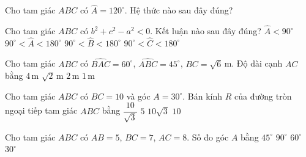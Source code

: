 \begin{ex}%
	Cho tam giác $ABC$  có $\widehat{A}=120^{\circ}$. Hệ thức nào sau đây đúng?
\end{ex}

\begin{ex}%
	Cho tam  giác $ABC$ có $b^2+c^2-a^2< 0$. Kết luận nào sau đây đúng?
	 \choice
		{$\widehat{A} <  90^\circ$}
		{\True $90^\circ  < \widehat{A} < 180^\circ$}
		{$90^\circ < \widehat{B} < 180^\circ$} 
		{$90^\circ < \widehat{C} < 180^\circ$} 
\end{ex}

\begin{ex}%
	Cho tam giác $ABC$ có $\widehat{BAC}=60^\circ$, $\widehat{ABC}=45^\circ$, $BC=\sqrt{6} $\,m. Độ dài cạnh  $AC$ bằng
	 \choice
		{$4$\,m} 
		 {$\sqrt{2}$\,m}
		 {\True $2$\,m}
		{$1$\,m} 
\end{ex}

\begin{ex}%
	 Cho tam giác $ABC$ có $BC=10$ và góc $A=30^\circ$. Bán kính $R$ của đường tròn ngoại tiếp tam giác $ABC$ bằng
	 \choice
		{$\dfrac{10}{\sqrt  3}$}
		{$5$} 
		{$10\sqrt 3 $} 
		 {\True $10$}
\end{ex}

\begin{ex}%
	 Cho tam giác $ABC$ có $AB=5$, $BC=7$, $AC=8$. Số đo góc $A$ bằng
	\choice 
		{$45^\circ$} 
		 {$90^\circ$}
		{\True $60^\circ$} 
		{$30^\circ$} 
\end{ex}

